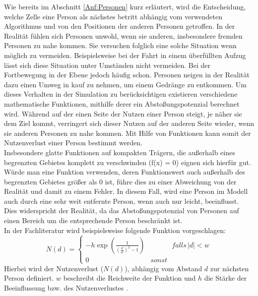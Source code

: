 Wie bereits im Abschnitt \ref{Anf:Personen} kurz erläutert, wird die Entscheidung, welche Zelle eine Person als nächstes betritt abhängig vom verwendeten Algorithmus und von den Positionen der anderen Personen getroffen. In der Realität fühlen sich Personen unwohl, wenn sie anderen, insbesondere fremden Personen zu nahe kommen. Sie versuchen folglich eine solche Situation wenn möglich zu vermeiden. Beispielsweise bei der Fahrt in einem überfüllten Aufzug lässt sich diese Situation unter Umständen nicht vermeiden. Bei der Fortbewegung in der Ebene jedoch häufig schon. Personen neigen in der Realität dazu einen Umweg in kauf zu nehmen, um einem Gedränge zu entkommen. Um dieses Verhalten in der Simulation zu berücksichtigen existieren verschiedene mathematische Funktionen, mithilfe derer ein Abstoßungspotenzial berechnet wird. Während auf der einen Seite der Nutzen einer Person steigt, je näher sie dem Ziel kommt, verringert sich dieser Nutzen auf der anderen Seite wieder, wenn sie anderen Personen zu nahe kommen. Mit Hilfe von Funktionen kann somit der Nutzenverlust einer Person bestimmt werden. \\
Insbesondere glatte Funktionen auf kompakten Trägern, die außerhalb eines begrenzten Gebietes komplett zu verschwinden (f(x) = $0$) eignen sich hierfür gut. Würde man eine Funktion verwenden, deren Funktionswert auch außerhalb des begrenzten Gebietes größer als $0$ ist, führe dies zu einer Abweichung von der Realität und damit zu einem Fehler. In diesem Fall, wird eine Person im Modell auch durch eine sehr weit entfernte Person, wenn auch nur leicht, beeinflusst. Dies widerspricht der Realität, da das Abstoßungspotenzial von Personen auf einen Bereich um die entsprechende Person beschränkt ist. \\
In der Fachliteratur wird beispielsweise folgende Funktion vorgeschlagen:
\begin{displaymath}
\label{equ:NutzenverlustSCHLECHT}
N(d) = 
\left\{ 
\begin{array}{cc}
-h \exp(\frac{1}{(\frac{d}{w})^2 -1}) & \;\;\;\;\;\;\;\;\;\;\; falls\, |d| < w  \\
0 & sonst  
\end{array} 
\right.
\end{displaymath}
Hierbei wird der Nutzenverlust ($N(d)$), abhängig vom Abstand $d$ zur nächsten Person definiert. $w$ beschreibt die Reichweite der Funktion und $h$ die Stärke der Beeinflussung bzw. des Nutzenverlustes \cite{DIETRICH2014841}. \\ 
